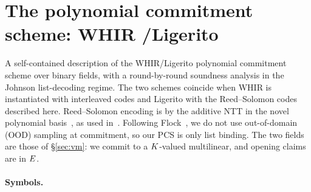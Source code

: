 \section{The polynomial commitment scheme: WHIR \slash Ligerito}\label{annex:pcs}

A self-contained description of the WHIR\slash Ligerito polynomial commitment scheme \cite{ACFY25,NA25} over binary fields, with a round-by-round soundness analysis in the Johnson list-decoding regime. The two schemes coincide when WHIR is instantiated with interleaved codes and Ligerito with the Reed--Solomon codes described here. Reed--Solomon encoding is by the additive NTT in the novel polynomial basis~\cite{LCH14}, as used in~\cite{DP24}. Following Flock~\cite{Flock26}, we do not use out-of-domain (OOD) sampling at commitment, so our PCS is only list binding. The two fields are those of \S\ref{sec:vm}: we commit to a $K$-valued multilinear, and opening claims are in $E$.

\paragraph{Symbols.}

